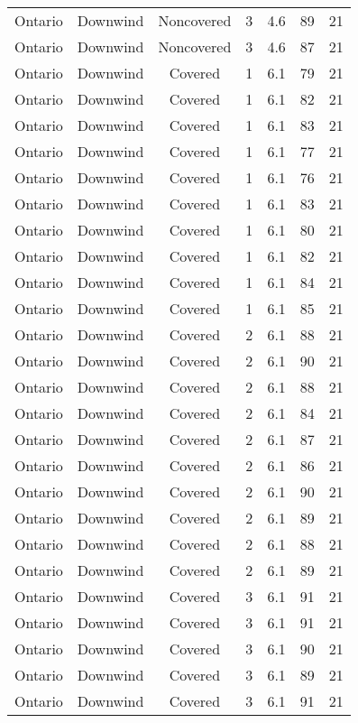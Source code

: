 \documentclass{article}
\begin{document}
\begin{longtable}[H]{ccccccc}
Ontario & Downwind & Noncovered & 3 & 4.6  & 89  & 21 \\
Ontario & Downwind & Noncovered & 3 & 4.6  & 87  & 21 \\
Ontario & Downwind & Covered     & 1 & 6.1  & 79  & 21 \\
Ontario & Downwind & Covered     & 1 & 6.1  & 82  & 21 \\
Ontario & Downwind & Covered     & 1 & 6.1  & 83  & 21 \\
Ontario & Downwind & Covered     & 1 & 6.1  & 77  & 21 \\
Ontario & Downwind & Covered     & 1 & 6.1  & 76  & 21 \\
Ontario & Downwind & Covered     & 1 & 6.1  & 83  & 21 \\
Ontario & Downwind & Covered     & 1 & 6.1  & 80  & 21 \\
Ontario & Downwind & Covered     & 1 & 6.1  & 82  & 21 \\
Ontario & Downwind & Covered     & 1 & 6.1  & 84  & 21 \\
Ontario & Downwind & Covered     & 1 & 6.1  & 85  & 21 \\
Ontario & Downwind & Covered     & 2 & 6.1  & 88  & 21 \\
Ontario & Downwind & Covered     & 2 & 6.1  & 90  & 21 \\
Ontario & Downwind & Covered     & 2 & 6.1  & 88  & 21 \\
Ontario & Downwind & Covered     & 2 & 6.1  & 84  & 21 \\
Ontario & Downwind & Covered     & 2 & 6.1  & 87  & 21 \\
Ontario & Downwind & Covered     & 2 & 6.1  & 86  & 21 \\
Ontario & Downwind & Covered     & 2 & 6.1  & 90  & 21 \\
Ontario & Downwind & Covered     & 2 & 6.1  & 89  & 21 \\
Ontario & Downwind & Covered     & 2 & 6.1  & 88  & 21 \\
Ontario & Downwind & Covered     & 2 & 6.1  & 89  & 21 \\
Ontario & Downwind & Covered     & 3 & 6.1  & 91  & 21 \\
Ontario & Downwind & Covered     & 3 & 6.1  & 91  & 21 \\
Ontario & Downwind & Covered     & 3 & 6.1  & 90  & 21 \\
Ontario & Downwind & Covered     & 3 & 6.1  & 89  & 21 \\
Ontario & Downwind & Covered     & 3 & 6.1  & 91  & 21 \\

\end{longtable}
\end{document}

